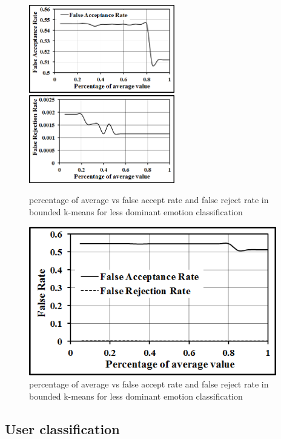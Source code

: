 \begin{figure}
\centering
\includegraphics[width=2.5in,clip,keepaspectratio]{Chapters/figures/Emotion/lessDominant/fA}
\includegraphics[width=2.5in,clip,keepaspectratio]{Chapters/figures/Emotion/lessDominant/fR}
\caption{percentage of average vs false accept rate and false reject rate in bounded k-means for less dominant emotion classification}
\label{Optional 6}
\end{figure}

\begin{figure}
\centering
\includegraphics[width=4.25in,clip,keepaspectratio]{Chapters/figures/Emotion/lessDominant/fAfR}
\caption{percentage of average vs false accept rate and false reject rate in bounded k-means for less dominant emotion classification}
\label{Optional 6}
\end{figure}



\clearpage
\subsection{User classification}
